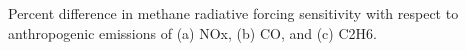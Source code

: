 Percent difference in methane radiative forcing sensitivity with respect to anthropogenic emissions of (a) NOx, (b) CO, and (c) C2H6. \label{fig:diffwindow}